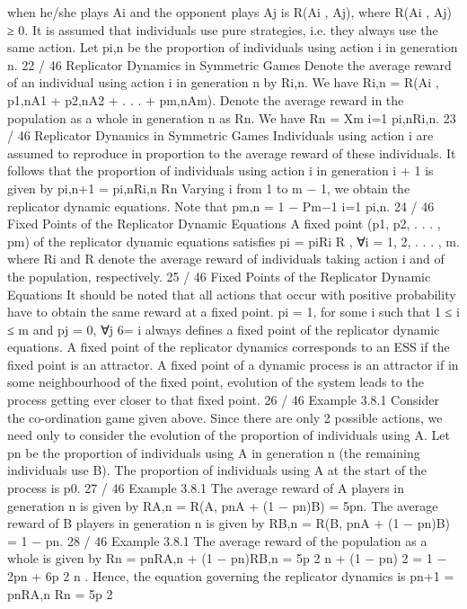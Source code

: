 \documentclass[]{report}
\begin{document}
when he/she plays Ai and the opponent plays Aj
is R(Ai
, Aj),
where R(Ai
, Aj) ≥ 0.
It is assumed that individuals use pure strategies, i.e. they always
use the same action.
Let pi,n be the proportion of individuals using action i in
generation n.
22 / 46
Replicator Dynamics in Symmetric Games
Denote the average reward of an individual using action i in
generation n by Ri,n. We have
Ri,n = R(Ai
, p1,nA1 + p2,nA2 + . . . + pm,nAm).
Denote the average reward in the population as a whole in
generation n as Rn. We have
Rn =
Xm
i=1
pi,nRi,n.
23 / 46
Replicator Dynamics in Symmetric Games
Individuals using action i are assumed to reproduce in proportion
to the average reward of these individuals. It follows that the
proportion of individuals using action i in generation i + 1 is given
by
pi,n+1 =
pi,nRi,n
Rn
Varying i from 1 to m − 1, we obtain the replicator dynamic
equations.
Note that pm,n = 1 −
Pm−1
i=1 pi,n.
24 / 46
Fixed Points of the Replicator Dynamic Equations
A fixed point (p1, p2, . . . , pm) of the replicator dynamic equations
satisfies
pi =
piRi
R
, ∀i = 1, 2, . . . , m.
where Ri and R denote the average reward of individuals taking
action i and of the population, respectively.
25 / 46
Fixed Points of the Replicator Dynamic Equations
It should be noted that all actions that occur with positive
probability have to obtain the same reward at a fixed point.
pi = 1, for some i such that 1 ≤ i ≤ m and pj = 0, ∀j 6= i always
defines a fixed point of the replicator dynamic equations.
A fixed point of the replicator dynamics corresponds to an ESS if
the fixed point is an attractor.
A fixed point of a dynamic process is an attractor if in some
neighbourhood of the fixed point, evolution of the system leads to
the process getting ever closer to that fixed point.
26 / 46
Example 3.8.1
Consider the co-ordination game given above.
Since there are only 2 possible actions, we need only to consider
the evolution of the proportion of individuals using A.
Let pn be the proportion of individuals using A in generation n (the
remaining individuals use B). The proportion of individuals using A
at the start of the process is p0.
27 / 46
Example 3.8.1
The average reward of A players in generation n is given by
RA,n = R(A, pnA + (1 − pn)B) = 5pn.
The average reward of B players in generation n is given by
RB,n = R(B, pnA + (1 − pn)B) = 1 − pn.
28 / 46
Example 3.8.1
The average reward of the population as a whole is given by
Rn = pnRA,n + (1 − pn)RB,n = 5p
2
n + (1 − pn)
2 = 1 − 2pn + 6p
2
n
.
Hence, the equation governing the replicator dynamics is
pn+1 =
pnRA,n
Rn
=
5p
2
\end{document}
